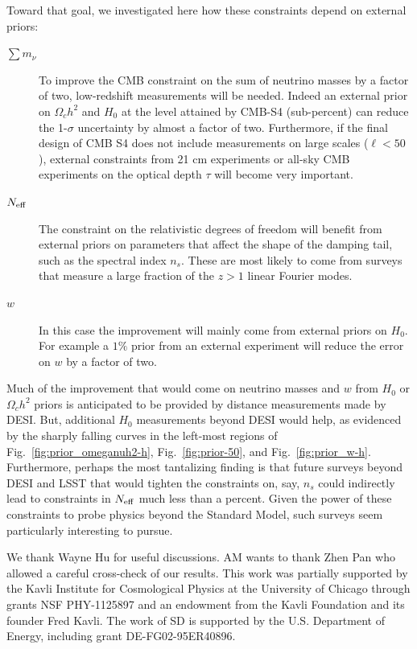 \documentclass[aps,prd,reprint,superscriptaddress,nofootinbib,floatfix]{revtex4-1}
\newcommand{\reffig}[1]{Fig.~\ref{fig:#1}}
\begin{document}
Toward that goal, we investigated here how these constraints depend on external priors:
\begin{description}
\item[$\sum m_\nu$] To improve the CMB constraint on the sum of neutrino masses by a factor of two, low-redshift measurements will be needed. Indeed an external prior on $\Omega_{c}h^{2}$ and $H_{0}$ at the level attained by CMB-S4 (sub-percent) can reduce the 1-$\sigma$ uncertainty by almost a factor of two.
Furthermore, if the final design of CMB S4 does not include measurements on large scales ($\ell<50$), external constraints from 21 cm experiments or all-sky CMB experiments on the optical depth $\tau$ will become very important.%
\item[$N_{\rm eff}$] The constraint on the relativistic degrees of freedom will benefit from external priors on parameters that affect the shape of the damping tail, such as the spectral index $n_s$. These are most likely to come from surveys that measure a large fraction of the $z>1$ linear Fourier modes.
\item[$w$] In this case the improvement will mainly come from external priors on $H_{0}$. For example a $1\%$ prior from an external experiment will reduce the error on $w$ by a factor of two.\end{description}

Much of the improvement that would come on neutrino masses and $w$ from $H_0$ or $\Omega_ch^2$ priors is anticipated to be provided by distance measurements made by DESI. But, additional $H_0$ measurements beyond DESI would help, as evidenced by the sharply falling curves in the left-most regions of \reffig{prior_omeganuh2-h}, \reffig{prior-50}, and \reffig{prior_w-h}. Furthermore, perhaps the most tantalizing finding is that future surveys beyond DESI and LSST \cite{lsst-dark-energy-science-collaboration:2012} that would tighten the constraints on, say, $n_s$ could indirectly lead to constraints in $N_{\rm eff}$ much less than a percent. Given the power of these constraints to probe physics beyond the Standard Model, such surveys seem particularly interesting to pursue.

\begin{acknowledgments}
We thank Wayne Hu for useful discussions. AM wants to thank Zhen Pan who allowed a careful cross-check of our results.
This work was partially supported by the Kavli Institute for Cosmological Physics at the University of Chicago through grants NSF PHY-1125897 and an endowment from the Kavli Foundation and its founder Fred Kavli.
The work of SD is supported by the U.S. Department of Energy, including grant DE-FG02-95ER40896.
\end{acknowledgments}


\end{document}
